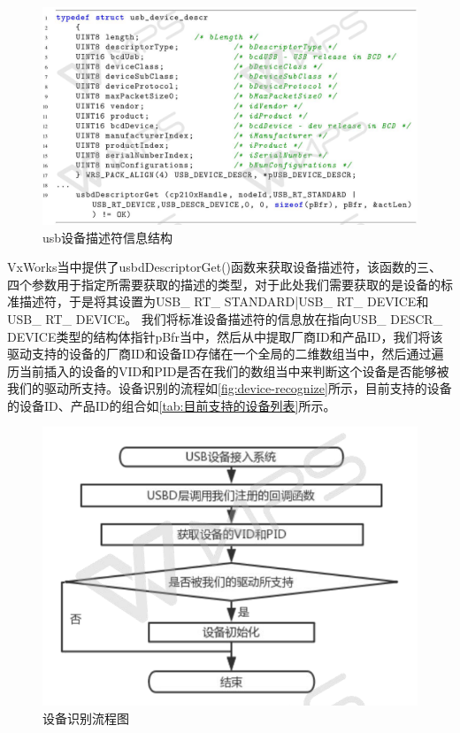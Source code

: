 \begin{figure}[!h]
\centering
\includegraphics[width=1.0\textwidth]{./graphics/usdbDescriptorGet.pdf}
\caption{usb设备描述符信息结构}\label{fig:usdbDescriptorGet}
\end{figure}

VxWorks当中提供了usbdDescriptorGet()函数来获取设备描述符，该函数的三、四个参数用于指定所需要获取的描述的类型，对于此处我们需要获取的是设备的标准描述符，于是将其设置为USB\_ RT\_ STANDARD|USB\_ RT\_ DEVICE和USB\_ RT\_ DEVICE。
	我们将标准设备描述符的信息放在指向USB\_ DESCR\_ DEVICE类型的结构体指针pBfr当中，然后从中提取厂商ID和产品ID，我们将该驱动支持的设备的厂商ID和设备ID存储在一个全局的二维数组当中，然后通过遍历当前插入的设备的VID和PID是否在我们的数组当中来判断这个设备是否能够被我们的驱动所支持。设备识别的流程如\autoref{fig:device-recognize}所示，目前支持的设备的设备ID、产品ID的组合如\autoref{tab:目前支持的设备列表}所示。
\begin{figure}[!h]
\centering
\includegraphics[width=1.0\textwidth]{./graphics/device-recognize.pdf}
\caption{设备识别流程图}\label{fig:device-recognize}
\end{figure}

